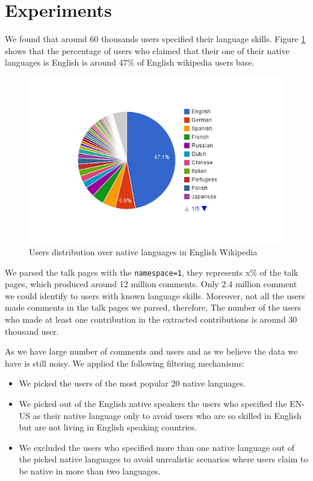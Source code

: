 \documentclass[11pt]{article}
\begin{document}
\section{Experiments}
We found that around 60 thousands users specified their language skills. Figure \ref{native_dist} shows that the percentage of users who claimed that their one of their native languages is English is around 47\% of English wikipedia users base. 
\begin{figure}[htp]
\centering
\includegraphics[scale=0.5]{chart_4.png}
\caption{Users distribution over native languages in English Wikipedia}
\label{native_dist}
\end{figure}

We parsed the talk pages with the \verb+namespace=1+, they represents x\% of the talk pages, which produced around 12 million comments. Only 2.4 million comment we could identify to users with known language skills. Moreover, not all the users made comments in the talk pages we parsed, therefore, The number of the users who made at least one contribution in the extracted contributions is around 30 thousand user.

As we have large number of comments and users and as we believe the data we have is still noisy. We applied the following filtering mechanisms:
\begin{itemize}
\item We picked the users of the most popular 20 native languages.
\item We picked out of the English native speakers the users who specified the EN-US as their native language only to avoid users who are so skilled in English but are not living in English speaking countries.
\item We excluded the users who specified more than one native language out of the picked native languages to avoid unrealistic scenarios where users claim to be native in more than two languages.
\end{itemize}
\end{document}
